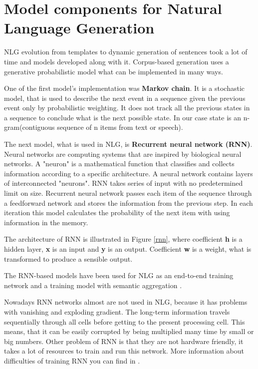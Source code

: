 \section{Model components for Natural Language Generation}
NLG evolution from templates to dynamic generation of sentences took a lot of time and models developed along with it. Corpus-based generation uses a generative probabilistic model what can be implemented in many ways.

One of the first model's implementation was \textbf{Markov chain}. It is a stochastic model, that is used to describe the next event in a sequence given the previous event only by probabilistic weighting. It does not track all the previous states in a sequence to conclude what is the next possible state. In our case state is an n-gram(contiguous sequence of n items from text or speech).

The next model, what is used in NLG, is \textbf{Recurrent neural network (RNN)}. Neural networks are computing systems that are inspired by biological neural networks. A "neuron" is a mathematical function that classifies and collects information according to a specific architecture. A neural network contains layers of interconnected "neurons". RNN takes series of input with no predetermined limit on size. Recurrent neural network passes each item of the sequence through a feedforward network and stores the information from the previous step. In each iteration this model calculates the probability of the next item with using information in the memory.

The architecture of RNN is illustrated in Figure \ref{rnn}, where coefficient \textbf{h} is a hidden layer, \textbf{x} is an input and \textbf{y} is an output. Coefficient \textbf{w} is a weight, what is transformed to produce a sensible output.

The RNN-based models have been used for NLG as an end-to-end training network \cite{network_nlg} and a training model with semantic aggregation \cite{rnn_nlg}. 

Nowadays RNN networks almost are not used in NLG, because it has problems with vanishing and exploding gradient. The long-term information travels sequentially  through all cells before getting to the present processing cell. This means, that it can be easily corrupted by being multiplied many time by small or big numbers. Other problem of RNN is that they are not hardware friendly, it takes a lot of resources to train and run this network. More information about difficulties of training RNN you can find in \cite{rnn_difficulties}.

